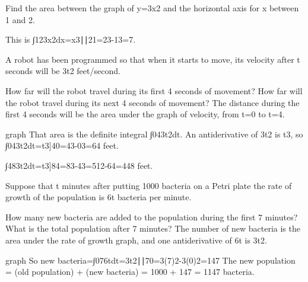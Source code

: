 \begin{example}
Find the area between the graph of y=3x2 and the horizontal axis for x between 1 and 2.

\begin{solution}
  This is
∫123x2dx=x3∣∣21=23-13=7.
\end{solution}\end{example}

\begin{example}
A robot has been programmed so that when it starts to move, its velocity after t seconds will be 3t2 feet/second.

\begin{solution}
How far will the robot travel during its first 4 seconds of movement?
How far will the robot travel during its next 4 seconds of movement?
The distance during the first 4 seconds will be the area under the graph of velocity, from t=0 to t=4.

graph
That area is the definite integral ∫043t2dt. An antiderivative of 3t2 is t3, so ∫043t2dt=t3]40=43-03=64 feet.

∫483t2dt=t3]84=83-43=512-64=448 feet.
\end{solution}\end{example}

\begin{example}
Suppose that t minutes after putting 1000 bacteria on a Petri plate the rate of growth of the population is 6t bacteria per minute.

\begin{solution}
How many new bacteria are added to the population during the first 7 minutes?
What is the total population after 7 minutes?
The number of new bacteria is the area under the rate of growth graph, and one antiderivative of 6t is 3t2.

graph
So
new bacteria=∫076tdt=3t2∣∣70=3(7)2-3(0)2=147
The new population = (old population) + (new bacteria) = 1000 + 147 = 1147 bacteria.
\end{solution}\end{example}

